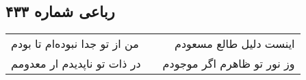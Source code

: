 \begin{center}
\section*{رباعی شماره ۴۳۳}
\label{sec:sh433}
\begin{longtable}{l p{0.5cm} r}
من از تو جدا نبوده‌ام تا بودم
&&
اینست دلیل طالع مسعودم
\\
در ذات تو ناپدیدم ار معدومم
&&
وز نور تو ظاهرم اگر موجودم
\\
\end{longtable}
\end{center}
